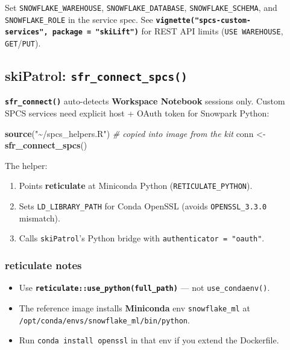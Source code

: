\documentclass[
]{article}
\newenvironment{Shaded}{\begin{snugshade}}{\end{snugshade}}
\newcommand{\CommentTok}[1]{\textcolor[rgb]{0.56,0.35,0.01}{\textit{#1}}}
\newcommand{\FunctionTok}[1]{\textcolor[rgb]{0.13,0.29,0.53}{\textbf{#1}}}
\newcommand{\NormalTok}[1]{#1}
\newcommand{\OtherTok}[1]{\textcolor[rgb]{0.56,0.35,0.01}{#1}}
\newcommand{\StringTok}[1]{\textcolor[rgb]{0.31,0.60,0.02}{#1}}
\providecommand{\tightlist}{%
  \setlength{\itemsep}{0pt}\setlength{\parskip}{0pt}}
\begin{document}
Set \texttt{SNOWFLAKE\_WAREHOUSE}, \texttt{SNOWFLAKE\_DATABASE},
\texttt{SNOWFLAKE\_SCHEMA}, and \texttt{SNOWFLAKE\_ROLE} in the service
spec. See
\textbf{\texttt{vignette("spcs-custom-services",\ package\ =\ "skiLift")}}
for REST API limits (\texttt{USE\ WAREHOUSE},
\texttt{GET}/\texttt{PUT}).

\subsection{\texorpdfstring{skiPatrol:
\texttt{sfr\_connect\_spcs()}}{skiPatrol: sfr\_connect\_spcs()}}\label{skipatrol-sfr_connect_spcs}

\textbf{\texttt{sfr\_connect()}} auto-detects \textbf{Workspace
Notebook} sessions only. Custom SPCS services need explicit host + OAuth
token for Snowpark Python:

\begin{Shaded}
\begin{Highlighting}[]
\FunctionTok{source}\NormalTok{(}\StringTok{"\textasciitilde{}/spcs\_helpers.R"}\NormalTok{)   }\CommentTok{\# copied into image from the kit}
\NormalTok{conn }\OtherTok{\textless{}{-}} \FunctionTok{sfr\_connect\_spcs}\NormalTok{()}
\end{Highlighting}
\end{Shaded}

The helper:

\begin{enumerate}
\def\labelenumi{\arabic{enumi}.}
\tightlist
\item
  Points \textbf{reticulate} at Miniconda Python
  (\texttt{RETICULATE\_PYTHON}).
\item
  Sets \texttt{LD\_LIBRARY\_PATH} for Conda OpenSSL (avoids
  \texttt{OPENSSL\_3.3.0} mismatch).
\item
  Calls \texttt{skiPatrol}'s Python bridge with
  \texttt{authenticator\ =\ "oauth"}.
\end{enumerate}

\subsubsection{reticulate notes}\label{reticulate-notes}

\begin{itemize}
\tightlist
\item
  Use \textbf{\texttt{reticulate::use\_python(full\_path)}} --- not
  \texttt{use\_condaenv()}.
\item
  The reference image installs \textbf{Miniconda} env
  \texttt{snowflake\_ml} at
  \texttt{/opt/conda/envs/snowflake\_ml/bin/python}.
\item
  Run \texttt{conda\ install\ openssl} in that env if you extend the
  Dockerfile.
\end{itemize}
\end{document}
